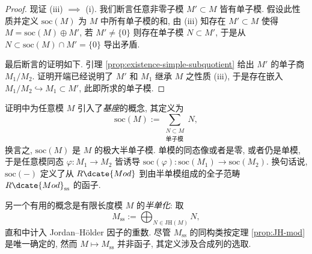 \begin{proof}
	现证 (iii) $\implies$ (i). 我们断言任意非零子模 $M' \subset M$ 皆有单子模. 假设此性质并定义 $\text{soc}(M)$ 为 $M$ 中所有单子模的和, 由 (iii) 知存在 $M' \subset M$ 使得 $M = \text{soc}(M) \oplus M'$, 若 $M' \neq \{0\}$ 则存在单子模 $N \subset M'$, 于是从 $N \subset \text{soc}(M) \cap M' = \{0\}$ 导出矛盾.

	最后断言的证明如下. 引理 \ref{prop:existence-simple-subquotient} 给出 $M'$ 的单子商 $M_1/M_2$. 证明开端已经说明了 $M'$ 和 $M_1$ 继承 $M$ 之性质 (iii), 于是存在嵌入 $M_1/M_2 \hookrightarrow M_1 \subset M'$, 此即所求的单子模.
\end{proof}

证明中为任意模 $M$ 引入了\emph{基座}的概念, 其定义为
\[ \text{soc}(M) := \sum_{\substack{N \subset M \\ \text{单子模} }} N, \]
换言之, $\text{soc}(M)$ 是 $M$ 的极大半单子模. 单模的同态像或者是零, 或者仍是单模, 于是任意模同态 $\varphi: M_1 \to M_2$ 皆诱导 $\text{soc}(\varphi): \text{soc}(M_1) \to \text{soc}(M_2)$. 换句话说, $\text{soc}(-)$ 定义了从 $R\dcate{Mod}$ 到由半单模组成的全子范畴 $R\dcate{Mod}_{\text{ss}}$ 的函子.

另一个有用的概念是有限长度模 $M$ 的\emph{半单化}: 取
\[ M_\text{ss} := \bigoplus_{N \in \text{JH}(M)} N, \]
直和中计入 Jordan--Hölder 因子的重数. 尽管 $M_\text{ss}$ 的同构类按定理 \ref{prop:JH-mod} 是唯一确定的, 然而 $M \mapsto M_\text{ss}$ 并非函子, 其定义涉及合成列的选取.

